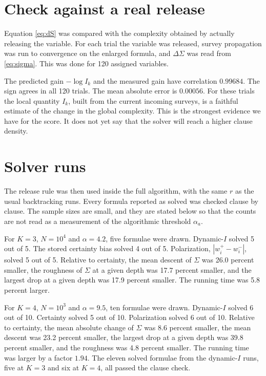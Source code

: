 \documentclass[11pt]{article}
\begin{document}
\section{Check against a real release}

Equation \eqref{eq:dS} was compared with the complexity obtained by actually releasing the variable. For each trial the variable was released, survey propagation was run to convergence on the enlarged formula, and $\Delta\Sigma$ was read from \eqref{eq:sigma}. This was done for 120 assigned variables.

The predicted gain $-\log I_k$ and the measured gain have correlation $0.99684$. The sign agrees in all 120 trials. The mean absolute error is $0.00056$. For these trials the local quantity $I_k$, built from the current incoming surveys, is a faithful estimate of the change in the global complexity. This is the strongest evidence we have for the score. It does not yet say that the solver will reach a higher clause density.

\section{Solver runs}

The release rule was then used inside the full algorithm, with the same $r$ as the usual backtracking runs. Every formula reported as solved was checked clause by clause. The sample sizes are small, and they are stated below so that the counts are not read as a measurement of the algorithmic threshold $\alpha_a$.

For $K=3$, $N=10^4$ and $\alpha=4.2$, five formulae were drawn. Dynamic-$I$ solved 5 out of 5. The stored certainty bias solved 4 out of 5. Polarization, $|w^+_i-w^-_i|$, solved 5 out of 5. Relative to certainty, the mean descent of $\Sigma$ was 26.0 percent smaller, the roughness of $\Sigma$ at a given depth was 17.7 percent smaller, and the largest drop at a given depth was 17.9 percent smaller. The running time was 5.8 percent larger.

For $K=4$, $N=10^3$ and $\alpha=9.5$, ten formulae were drawn. Dynamic-$I$ solved 6 out of 10. Certainty solved 5 out of 10. Polarization solved 6 out of 10. Relative to certainty, the mean absolute change of $\Sigma$ was 8.6 percent smaller, the mean descent was 23.2 percent smaller, the largest drop at a given depth was 39.8 percent smaller, and the roughness was 4.8 percent smaller. The running time was larger by a factor $1.94$. The eleven solved formulae from the dynamic-$I$ runs, five at $K=3$ and six at $K=4$, all passed the clause check.
\end{document}
